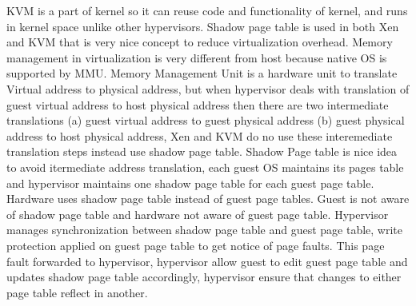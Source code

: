 \documentclass[seminar,twoside]{iitbreport}
\begin{document}
KVM is a part of kernel so it can reuse code and functionality of kernel, and runs in kernel space unlike other hypervisors.
Shadow page table is used in both Xen and KVM that is very nice concept to reduce virtualization overhead.
Memory management in virtualization is very different from host because native OS is supported by MMU. Memory Management Unit 
is a hardware unit to translate Virtual address to physical address, but when hypervisor deals with translation of guest virtual
address to host physical address then there are two intermediate translations (a) guest virtual address to guest physical address 
(b) guest physical address to host physical address, Xen and KVM do no use these interemediate translation steps instead use shadow page table.
Shadow Page table is nice idea to avoid itermediate address translation, each guest OS maintains its pages table and hypervisor 
maintains one shadow page table for each guest page table. Hardware uses shadow page table instead of guest page tables.
Guest is not aware of shadow page table and hardware not aware of guest page table. Hypervisor manages synchronization between shadow
page table and guest page table,  write protection applied on guest page table to get notice of page faults. This page fault forwarded to 
hypervisor, hypervisor allow guest to edit guest page table and updates shadow page table accordingly, hypervisor ensure that changes to either page table reflect in another.  
\end{document}
